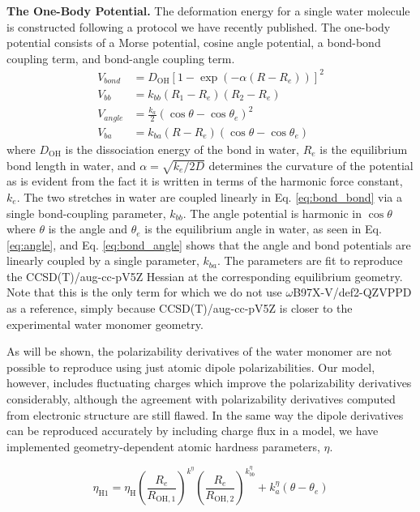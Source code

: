 \documentclass[journal=jctcce,manuscript=article]{achemso}
\begin{document}
\textbf{The One-Body Potential.} The deformation energy for a single water molecule is constructed following a protocol we have recently published.\cite{Sami2024} The one-body potential consists of a Morse potential, cosine angle potential, a bond-bond coupling term, and bond-angle coupling term. 
\begin{align}
  \label{eq:morse}
  V_{bond}&=D_{\mathrm{OH}}\left[ 1-\exp(-\alpha (R-R_e))\right]^2 \\
  \label{eq:bond_bond}
  V_{bb}&=k_{bb}(R_1-R_e)(R_2-R_e) \\
  \label{eq:angle}
  V_{angle}&=\frac{k_a}{2}(\cos\theta-\cos\theta_e)^2 \\
  \label{eq:bond_angle}
  V_{ba}&=k_{ba}(R-R_e)(\cos\theta-\cos\theta_e)
\end{align}
where $D_{\mathrm{OH}}$ is the dissociation energy of
the  bond in water, $R_e$ is the equilibrium bond length in water,
and $\alpha=\sqrt{k_e/2D}$ determines the curvature of the potential as is
evident from the fact it is written in terms of the harmonic force constant, $k_e$. The two  stretches in water are coupled linearly in Eq. \ref{eq:bond_bond}
via a single bond-coupling parameter, $k_{bb}$. The angle potential is harmonic in $\cos\theta$ where $\theta$ is the  angle
and $\theta_e$ is the equilibrium angle in water, as seen in Eq. \ref{eq:angle}, and 
Eq. \ref{eq:bond_angle} shows that the angle and bond potentials are linearly
coupled by a single parameter, $k_{ba}$. The parameters are fit to reproduce the CCSD(T)/aug-cc-pV5Z Hessian at the
corresponding equilibrium geometry. Note that this is the only term for which we do not
use $\omega$B97X-V/def2-QZVPPD as a reference, simply because CCSD(T)/aug-cc-pV5Z is closer to the experimental water monomer geometry.

As will be shown, the polarizability derivatives of the water monomer are not possible to reproduce using just atomic dipole polarizabilities. Our model, however, includes fluctuating charges which improve the polarizability derivatives considerably, although the agreement with polarizability derivatives computed from electronic structure are still flawed. In the same way the dipole derivatives can be reproduced accurately by including charge flux in a model\cite{liu2019implementation}, we have implemented geometry-dependent atomic hardness parameters, $\eta$.

\begin{equation}
  \eta_{\mathrm{H1}} = \eta_\mathrm{H} \left(\frac{R_e}{R_{\mathrm{OH,1}}}\right)^{k^\eta}\left(\frac{R_e}{R_{\mathrm{OH,2}}}\right)^{k^\eta_{bb}} + k^\eta_{a}(\theta - \theta_e)
  \label{eq:variable_hardness}
\end{equation}
\end{document}
